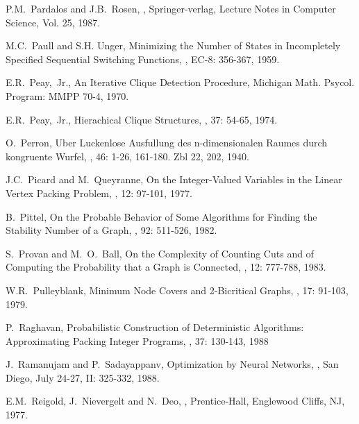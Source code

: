 \begin{thebibliography}{10}
P.M.~Pardalos and J.B.~Rosen,
,
\newblock Springer-verlag, Lecture Notes in Computer Science, Vol.
25, 1987. 


M.C.~Paull and S.H. Unger,
\newblock Minimizing the Number of States in Incompletely Specified
Sequential Switching Functions,
, EC-8: 356-367, 1959. 


E.R.~Peay,~Jr.,
\newblock An Iterative Clique Detection Procedure,
\newblock Michigan Math. Psycol. Program: MMPP 70-4, 1970.

E.R.~Peay,~Jr.,
\newblock Hierachical Clique Structures,
, 37: 54-65, 1974.

O.~Perron,
\newblock Uber Luckenlose Ausfullung des n-dimensionalen Raumes
durch kongruente Wurfel,
, 46: 1-26, 161-180. Zbl 22, 202, 1940.

J.C.~Picard and M.~Queyranne,
\newblock On the Integer-Valued Variables in the Linear Vertex
Packing Problem,
, 12: 97-101, 1977.

B.~Pittel,
\newblock On the Probable Behavior of Some Algorithms for Finding
the Stability Number of a Graph,
, 92: 511-526,
1982.

S.~Provan and M.~O.~Ball,
\newblock On the Complexity of Counting Cuts and of Computing the
Probability that a Graph is Connected,
, 12: 777-788, 1983.

W.R.~Pulleyblank,
\newblock Minimum Node Covers and 2-Bicritical Graphs,
, 17: 91-103, 1979.

P.~Raghavan,
\newblock Probabilistic Construction of Deterministic Algorithms:
Approximating Packing Integer Programs,
, 37: 130-143, 1988

J.~Ramanujam and P.~Sadayappanv,
\newblock Optimization by Neural Networks,
, San
Diego, July 24-27, II: 325-332, 1988.

E.M.~Reigold, J.~Nievergelt and N.~Deo,
,
\newblock Prentice-Hall, Englewood Cliffs, NJ, 1977.


\end{thebibliography}
